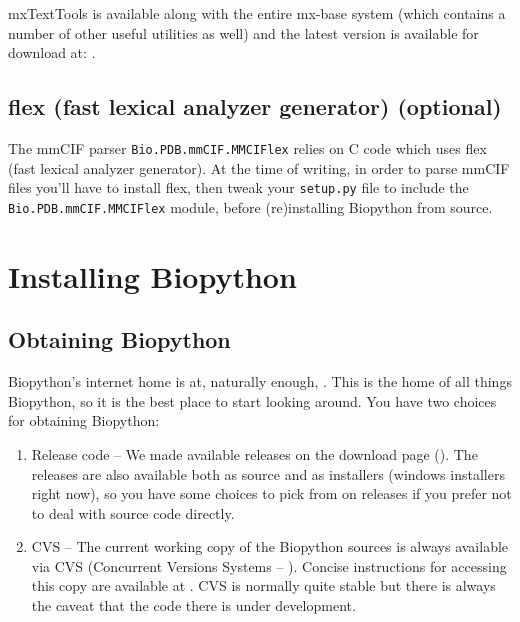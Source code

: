 \documentclass{article}
\begin{document}
mxTextTools is available along with the entire mx-base system (which
contains a number of other useful utilities as well) and the latest
version is available for download at:
.

\subsection{flex (fast lexical analyzer generator) (optional)}

The mmCIF parser \verb|Bio.PDB.mmCIF.MMCIFlex| relies on C code which
uses flex (fast lexical analyzer generator).  At the time of writing,
in order to parse mmCIF files you'll have to install flex, then tweak
your \verb|setup.py| file to include the \verb|Bio.PDB.mmCIF.MMCIFlex|
module, before (re)installing Biopython from source.

\section{Installing Biopython}

\subsection{Obtaining Biopython}
Biopython's internet home is at, naturally enough,  
. This is the home of all things 
Biopython, so it is the best place to start looking around. 
You have two choices for obtaining Biopython:

\begin{enumerate}

\item Release code -- We made available releases on the download page 
(). 
The releases are also available both as source and as installers 
(windows installers right now), so you have some choices to pick from 
on releases if you prefer not to deal with source code directly.

\item CVS -- The current working copy of the Biopython sources is always
available via CVS (Concurrent Versions Systems --
). Concise instructions for
accessing this copy are available at
. CVS is normally quite stable
but there is always the caveat that the code there is under
development.

\end{enumerate}
\end{document}

